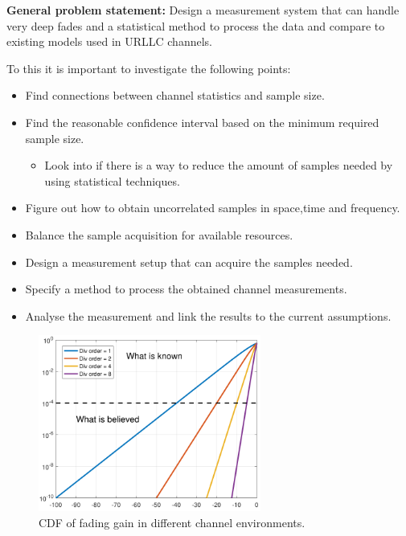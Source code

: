 \textbf{General problem statement:}
Design a measurement system that can handle very deep fades and a statistical method to process the data and compare to existing models used in URLLC channels.



To this it is important to investigate the following points: 

\begin{itemize}
	\item Find connections between channel statistics and sample size.
	\item Find the reasonable confidence interval based on the minimum required sample size.
	\begin{itemize}
	\item Look into if there is a way to reduce the amount of samples needed by using statistical techniques.
 	\end{itemize}
	\item Figure out how to obtain uncorrelated samples in space,time and frequency.
	\item Balance the sample acquisition for available resources. 
	\item Design  a measurement setup that can acquire the samples needed.
	\item Specify a method to process the obtained channel measurements.
	\item Analyse the measurement and link the results to the current assumptions.
\end{itemize}

\begin{figure}[H]
\centering
\includegraphics[width=0.65\textwidth]{figures/fading_gain.pdf}
\caption{\Gls{CDF} of fading gain in different channel environments.}
\label{fading_gain}
\end{figure}




